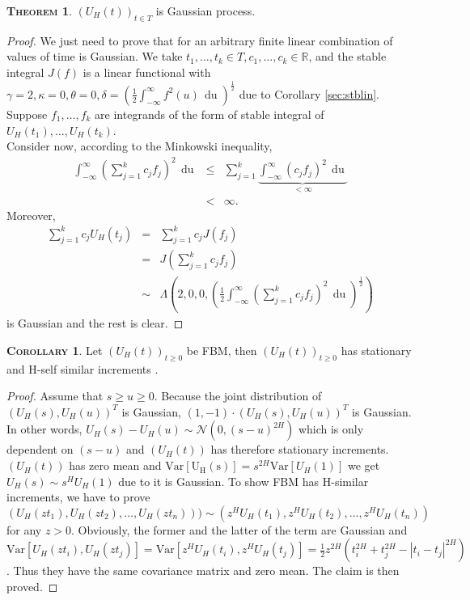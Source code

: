 \documentclass[a4paper, twoside, 11pt]{article}
\theoremstyle{definition}
\newtheorem{theorem}[definition]{\scshape Theorem}
\newtheorem{corollary}[definition]{\scshape Corollary}
\begin{document}
\begin{theorem}
  $(U_H(t))_{t\in T}$ is Gaussian process.
\end{theorem}

\begin{proof}
  We just need to prove that for an arbitrary finite linear combination of values of time is Gaussian. We take $t_1, \dots, t_k \in T, c_1, \dots, c_k \in \mathbb{R}$, and the stable integral $J(f) $ is a linear functional with $\gamma=2, \kappa=0, \theta=0, \delta= (\frac{1}{2}\int_{-\infty}^{\infty}f^2(u)\,\mathop{du})^{\frac{1}{2}}$ due to Corollary \ref{sec:stblin}. Suppose $f_1,\dots, f_k$ are integrands of the form of stable integral of $U_H(t_1), \dots, U_H(t_k)$. \\
  Consider now, according to the Minkowski inequality,
  \begin{eqnarray*}
	\int_{-\infty}^{\infty}(\sum_{j=1}^k c_jf_j)^2\,\mathop{du} &\le& \sum_{j=1}^k \underbrace{\int_{-\infty}^{\infty}(c_jf_j)^2\,\mathop{du}}_{<\infty}\\
	&<& \infty.
  \end{eqnarray*}
Moreover,
  \begin{eqnarray*}
	\sum_{j=1}^k c_jU_H(t_j) &=& \sum_{j=1}^k c_jJ(f_j)\\
	&=& J(\sum_{j=1}^k c_jf_j)\\
	&\sim& \Lambda(2, 0, 0, (\frac{1}{2}\int_{-\infty}^{\infty}(\sum_{j=1}^k c_jf_j)^2\,\mathop{du})^{\frac{1}{2}})
  \end{eqnarray*}
  is Gaussian and the rest is clear.
\end{proof}

\begin{corollary}
  Let $(U_H(t))_{t\ge 0}$ be FBM, then $(U_H(t))_{t\ge 0}$ has stationary and H-self similar increments . 
\end{corollary}
\begin{proof}
 Assume that $s \ge u \ge 0 $. Because the joint distribution of $(U_H(s), U_H(u))^T$ is Gaussian, $(1, -1) \cdot (U_H(s), U_H(u))^T $ is Gaussian. In other words,  $U_H(s) - U_H(u) \sim \mathcal{N}(0, (s-u)^{2H})$ which is only dependent on $(s-u)$ and $(U_H(t))$ has therefore stationary increments.\\
   $(U_H(t))$ has zero mean and $\mathrm{Var[U_H(s)]} = s^{2H}\mathrm{Var}[U_H(1)]$ we get $U_H(s) \sim s^HU_H(1)$ due to it is Gaussian.
   To show FBM has H-similar increments, we have to prove\\ $(U_H(zt_1), U_H(zt_2),\dots, U_H(zt_n))) \sim (z^HU_H(t_1), z^HU_H(t_2),\dots, z^HU_H(t_n))$ for any $z > 0$. Obviously, the former and the latter of the term are Gaussian and $\mathrm{Var}[U_H(zt_i), U_H(zt_j)] = \mathrm{Var}[z^HU_H(t_i), z^HU_H(t_j)] = \frac{1}{2}z^{2H}(t_i^{2H} + t_j^{2H} - |t_i-t_j|^{2H})$. Thus they have the same covariance matrix and zero mean. The claim is then proved.
\end{proof}
\end{document}
